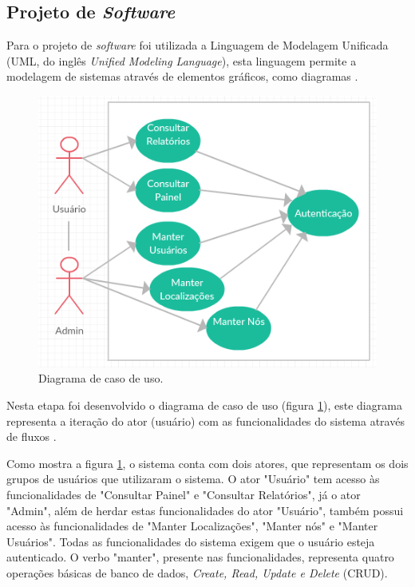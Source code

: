 \subsection{Projeto de \textit{Software}}
Para o projeto de \textit{software} foi utilizada a Linguagem de Modelagem Unificada (UML, do inglês \textit{Unified Modeling Language}), esta linguagem permite a modelagem de sistemas através de elementos gráficos, como diagramas \cite{bezerra2017iterativoeincremental}. 

\begin{figure}[H]
    \centering
    \includegraphics[scale=0.8]{04-figuras/caso_de_uso.png}
    \caption{Diagrama de caso de uso.}
    \vspace{-\baselineskip}
    \label{fig:caso-de-uso}
\end{figure}

Nesta etapa foi desenvolvido o diagrama de caso de uso (figura \ref{fig:caso-de-uso}), este diagrama representa a iteração do ator (usuário) com as funcionalidades do sistema através de fluxos \cite{gomes2003casodeuso}.

Como mostra a figura \ref{fig:caso-de-uso}, o sistema conta com dois atores, que representam os
dois grupos de usuários que utilizaram o sistema. O ator "Usuário" tem acesso às funcionalidades de "Consultar Painel" e "Consultar Relatórios", já o ator "Admin", além de herdar estas funcionalidades do ator "Usuário", também possui acesso às funcionalidades de "Manter Localizações", "Manter nós" e "Manter Usuários". Todas as funcionalidades do sistema exigem que o usuário esteja autenticado. O verbo "manter", presente nas funcionalidades, representa quatro operações básicas de banco de dados, \textit{Create, Read, Update e Delete} (CRUD).

